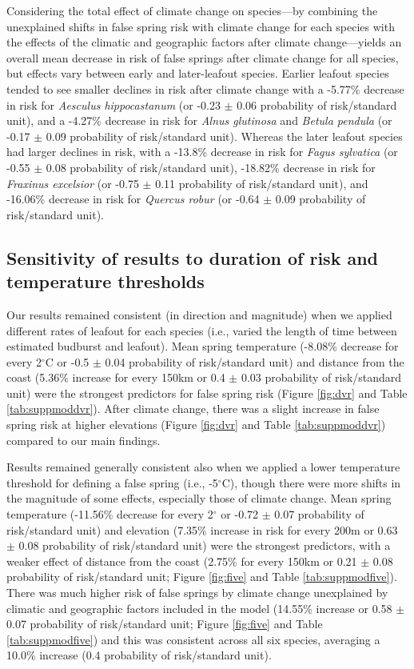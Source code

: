 \documentclass{article}\usepackage[]{graphicx}\usepackage[]{color}
\begin{document}
Considering the total effect of climate change on species---by combining the unexplained shifts in false spring risk with climate change for each species with the effects of the climatic and geographic factors after climate change---yields an overall mean decrease in risk of false springs after climate change for all species, but effects vary between early and later-leafout species. Earlier leafout species tended to see smaller declines in risk after climate change with a -5.77\% decrease in risk for \textit{Aesculus hippocastanum} (or -0.23 $\pm$ 0.06 probability of risk/standard unit), and a -4.27\% decrease in risk for \textit{Alnus glutinosa} and \textit{Betula pendula} (or -0.17 $\pm$ 0.09 probability of risk/standard unit). Whereas the later leafout species had larger declines in risk, with a -13.8\% decrease in risk for \textit{Fagus sylvatica} (or -0.55 $\pm$ 0.08 probability of risk/standard unit), -18.82\% decrease in risk for \textit{Fraxinus excelsior} (or -0.75 $\pm$ 0.11 probability of risk/standard unit), and -16.06\% decrease in risk for \textit{Quercus robur} (or -0.64 $\pm$ 0.09 probability of risk/standard unit).  

\subsection*{Sensitivity of results to duration of risk and temperature thresholds}
Our results remained consistent (in direction and magnitude) when we applied different rates of leafout for each species (i.e., varied the length of time between estimated budburst and leafout). Mean spring temperature (-8.08\% decrease for every 2$^\circ$C or -0.5 $\pm$ 0.04 probability of risk/standard unit) and distance from the coast (5.36\% increase for every 150km or 0.4 $\pm$ 0.03 probability of risk/standard unit) were the strongest predictors for false spring risk (Figure \ref{fig:dvr} and Table \ref{tab:suppmoddvr}). After climate change, there was a slight increase in false spring risk at higher elevations (Figure \ref{fig:dvr} and Table \ref{tab:suppmoddvr}) compared to our main findings. 

Results remained generally consistent also when we applied a lower temperature threshold for defining a false spring (i.e., -5$^{\circ}$C), though there were more shifts in the magnitude of some effects, especially those of climate change. Mean spring temperature (-11.56\% decrease for every 2$^\circ$ or -0.72 $\pm$ 0.07 probability of risk/standard unit) and elevation (7.35\% increase in risk for every 200m or 0.63 $\pm$ 0.08 probability of risk/standard unit) were the strongest predictors, with a weaker effect of distance from the coast (2.75\% for every 150km or 0.21 $\pm$ 0.08 probability of risk/standard unit; Figure \ref{fig:five} and Table \ref{tab:suppmodfive}). There was much higher risk of false springs by climate change unexplained by climatic and geographic factors included in the model (14.55\% increase or 0.58 $\pm$ 0.07 probability of risk/standard unit; Figure \ref{fig:five} and Table \ref{tab:suppmodfive}) and this was consistent across all six species, averaging a 10.0\% increase (0.4 probability of risk/standard unit). 
\end{document}

